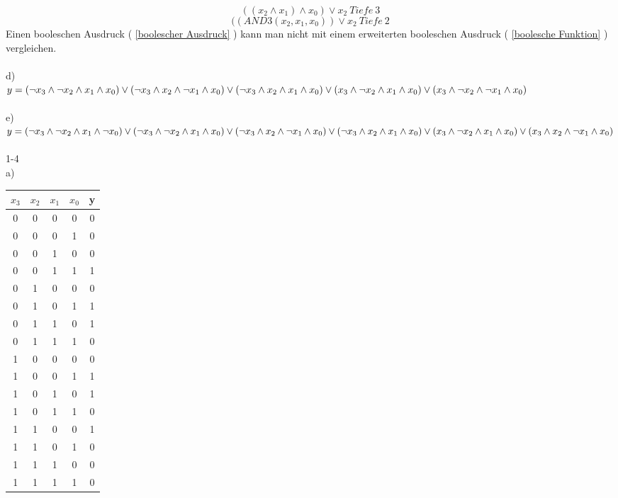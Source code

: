 \documentclass[11pt,a4paper]{article}
\begin{document}
\begin{equation}
\label{boolescher Ausdruck}
(( x_2 \wedge x_1 ) \wedge x_0 ) \vee x_2~Tiefe~3
\end{equation}
\begin{equation}
\label{boolesche Funktion}
((AND3(x_2,x_1,x_0))\vee x_2~Tiefe~2
\end{equation}
Einen booleschen Ausdruck ( \ref{boolescher Ausdruck} ) kann man nicht mit einem erweiterten booleschen Ausdruck  ( \ref{boolesche Funktion} ) vergleichen. \\ \\
d)\\
$
y=( \neg x_3 \wedge \neg x_2 \wedge x_1 \wedge x_0) \vee  ( \neg x_3 \wedge x_2 \wedge \neg x_1 \wedge x_0 ) \vee  ( \neg x_3 \wedge x_2 \wedge x_1 \wedge x_0  ) \vee \\
( x_3 \wedge \neg x_2 \wedge x_1 \wedge x_0 ) \vee ( x_3 \wedge \neg x_2 \wedge \neg x_1 \wedge x_0 )
$
\\ \\
e)\\
$
y=( \neg x_3 \wedge \neg x_2 \wedge x_1 \wedge \neg x_0 ) \vee ( \neg x_3 \wedge \neg x_2 \wedge x_1 \wedge x_0) \vee ( \neg x_3 \wedge x_2 \wedge \neg x_1 \wedge x_0) \vee \\ ( \neg x_3 \wedge x_2 \wedge x_1 \wedge x_0) \vee ( x_3 \wedge \neg x_2 \wedge x_1 \wedge x_0) \vee (x_3 \wedge x_2 \wedge \neg x_1 \wedge x_0)$\\
\\
1-4\\
a)\\
\begin{tabular}{c | c | c | c | c}
$x_3$&$x_2$&$x_1$&$x_0$&y\\ \hline
0&0&0&0&0\\
0&0&0&1&0\\
0&0&1&0&0\\
0&0&1&1&1\\ \hline
0&1&0&0&0\\
0&1&0&1&1\\
0&1&1&0&1\\
0&1&1&1&0\\ \hline
1&0&0&0&0\\
1&0&0&1&1\\
1&0&1&0&1\\
1&0&1&1&0\\ \hline
1&1&0&0&1\\
1&1&0&1&0\\
1&1&1&0&0\\
1&1&1&1&0\\
\end{tabular}\\ \\
\end{document}
